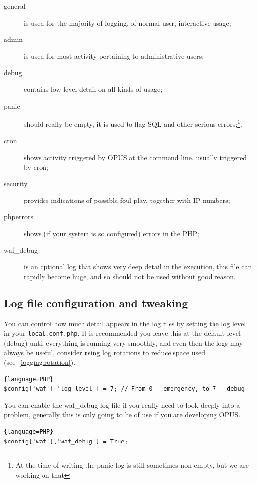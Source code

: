 \documentclass[12 pt]{book}
\begin{document}
\begin{description}
  \item[general] is used for the majority of logging, of normal user, interactive usage;
  \item[admin] is used for most activity pertaining to administrative users;
  \item[debug] contains low level detail on all kinds of usage;
  \item[panic] should really be empty, it is used to flag SQL and other serious errors;\footnote{At the time of writing the panic log is still sometimes non empty, but we are working on that}.
  \item[cron] shows activity triggered by OPUS at the command line, usually triggered by cron;
  \item[security] provides indications of possible foul play, together with IP numbers;
  \item[phperrors] shows (if your system is so configured) errors in the PHP;
  \item[waf\_debug] is an optional log that shows very deep detail in the execution, this file can rapidly become huge, and so should not be used without good reason.
\end{description}

\subsection{Log file configuration and tweaking}

You can control how much detail appears in the log files by setting the log level in your \lstinline!local.conf.php!.
It is recommended you leave this at the default level (debug) until everything is running very smoothly, and even then
the logs may always be useful, consider using log rotations to reduce space used (see~\ref{logging:rotation}).

\begin{lstlisting}{language=PHP}
$config['waf']['log_level'] = 7; // From 0 - emergency, to 7 - debug
\end{lstlisting}

You can enable the waf\_debug log file if you really need to look deeply into a problem, generally this is only going
to be of use if you are developing OPUS.

\begin{lstlisting}{language=PHP}
$config['waf']['waf_debug'] = True;
\end{lstlisting}
\end{document}
